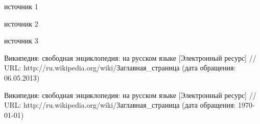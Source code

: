 \begin{thebibliography}{00}

 источник 1

 источник 2

 источник 3

 Википедия: свободная энциклопедия: на русском языке [Электронный ресурс] // URL:  http://ru.wikipedia.org/wiki/Заглавная\_страница  (дата обращения: 06.05.2013)

 Википедия: свободная энциклопедия: на русском языке [Электронный ресурс] // URL:  http://ru.wikipedia.org/wiki/Заглавная\_страница  (дата обращения: \ddmmyyyydate\today)

\end{thebibliography}